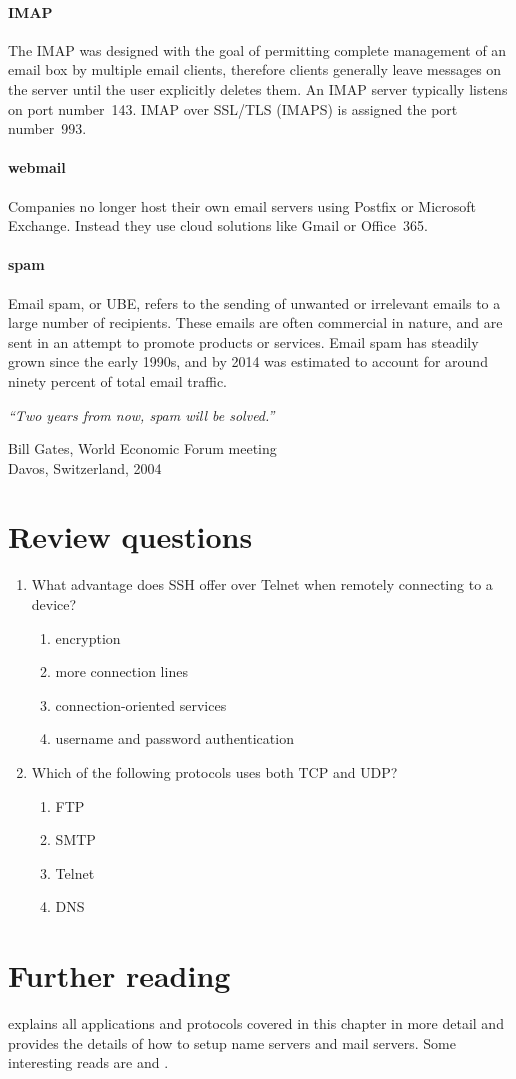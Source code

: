 \paragraph{\acs{IMAP}}
The \acl{IMAP} was designed with the goal of permitting complete management of an email box by multiple email clients, therefore clients generally leave messages on the server until the user explicitly deletes them.
An \acs{IMAP} server typically listens on port number~143.
\acs{IMAP} over \acs{SSL}/\acs{TLS} (\acs{IMAPS}) is assigned the port number~993.

\paragraph{webmail}
Companies no longer host their own email servers using Postfix or Microsoft Exchange.
Instead they use cloud solutions like Gmail or Office~365.

\paragraph{spam}
Email spam, or \acf{UBE}, refers to the sending of unwanted or irrelevant emails to a large number of recipients.
These emails are often commercial in nature, and are sent in an attempt to promote products or services.
Email spam has steadily grown since the early 1990s, and by 2014 was estimated to account for around ninety percent of total email traffic.

\epigraph{\emph{``Two years from now, spam will be solved.''}}{Bill Gates, World Economic Forum meeting\\ Davos, Switzerland, 2004}



\section{Review questions}
\begin{enumerate}
\item
   What advantage does \acs{SSH} offer over Telnet when remotely connecting to a device?
   \begin{enumerate}
   \item encryption
   \item more connection lines
   \item connection-oriented services
   \item username and password authentication
   \end{enumerate}
\item
   Which of the following protocols uses both \acs{TCP} and \acs{UDP}?
   \begin{enumerate}
      \item \acs{FTP}
      \item \acs{SMTP}
      \item Telnet
      \item \acs{DNS}
   \end{enumerate}
\end{enumerate}


\section{Further reading}
\textcite{nemeth} explains all applications and protocols covered in this chapter in more detail and provides the details of how to setup name servers and mail servers.
Some interesting reads are  and .
